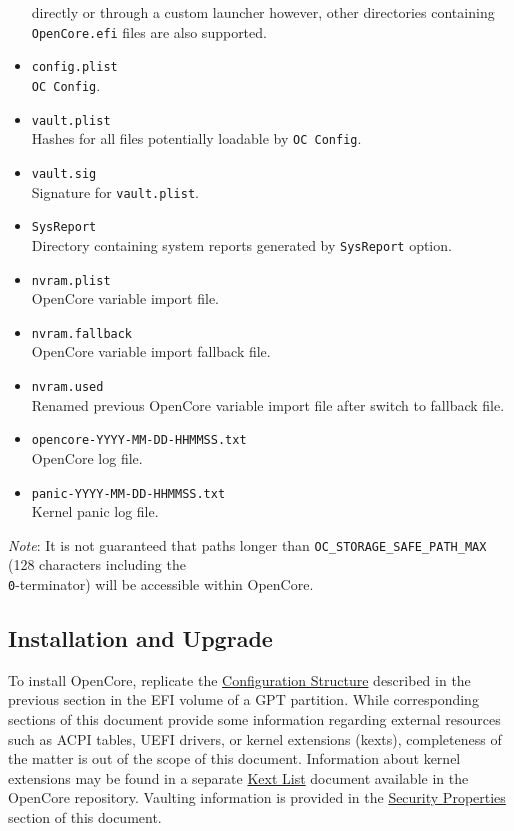 \documentclass[]{article}
\makeatletter
\renewcommand{\label}[1]{%
\zref@wrapper@immediate{\oldlabel{#1}}}  %
\makeatother
\begin{document}
\begin{itemize}
  directly or through a custom launcher however, other directories containing
  \texttt{OpenCore.efi} files are also supported.
\item
  \texttt{config.plist} \\
  \texttt{OC Config}.
\item
  \texttt{vault.plist} \\
  Hashes for all files potentially loadable by \texttt{OC Config}.
\item
  \texttt{vault.sig} \\
  Signature for \texttt{vault.plist}.
\item
  \texttt{SysReport} \\
  Directory containing system reports generated by \texttt{SysReport} option.
\item
  \texttt{nvram.plist} \\
  OpenCore variable import file.
\item
  \texttt{nvram.fallback} \\
  OpenCore variable import fallback file.
\item
  \texttt{nvram.used} \\
  Renamed previous OpenCore variable import file after switch to fallback file.
\item
  \texttt{opencore-YYYY-MM-DD-HHMMSS.txt} \\
  OpenCore log file.
\item
  \texttt{panic-YYYY-MM-DD-HHMMSS.txt} \\
  Kernel panic log file.
\end{itemize}

\emph{Note}: It is not guaranteed that paths longer than
\texttt{OC\_STORAGE\_SAFE\_PATH\_MAX} (128 characters including
the \texttt{\\0}-terminator) will be accessible within OpenCore.

\subsection{Installation and Upgrade}\label{configuration-install}

To install OpenCore, replicate the
\hyperref[configuration-structure]{Configuration Structure} described
in the previous section in the EFI volume of a GPT partition. While
corresponding sections of this document provide some information
regarding external resources such as ACPI tables, UEFI drivers,
or kernel extensions (kexts), completeness of the matter is out of
the scope of this document. Information about kernel extensions may
be found in a separate
\href{https://github.com/acidanthera/OpenCorePkg/blob/master/Docs/Kexts.md}{Kext List}
document available in the OpenCore repository. Vaulting information is provided in
the \hyperref[miscsecurityprops]{Security Properties} section of this document.
\end{document}
